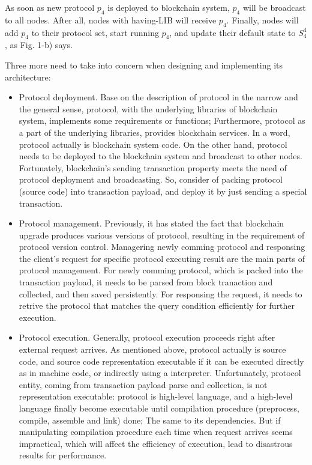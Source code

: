 \documentclass[sigplan,screen]{acmart}
\begin{document}
As soon as new protocol $p_4$ is deployed to blockchain system,
$p_4$ will be broadcast to all nodes. After all, nodes with having-LIB
will receive $p_4$. Finally, nodes will add $p_4$ to their protocol set, start
running $p_4$, and update their default state to $S_4^4$, as Fig. 1-b) says.

Three more need to take into concern when designing and implementing its
architecture:
\begin{itemize}
  \item Protocol deployment. Base on the description of protocol in the narrow
    and the general sense, protocol, with the underlying libraries of
    blockchain system, implements some requirements or functions; Furthermore,
    protocol as a part of the underlying libraries, provides blockchain services.
    In a word, protocol actually is blockchain system code. On the other hand,
    protocol needs to be deployed to the blockchain system and broadcast to
    other nodes. Fortunately, blockchain's sending transaction property meets
    the need of protocol deployment and broadcasting. So, consider of packing
    protocol (source code) into transaction payload, and deploy it by just
    sending a special transaction.
  \item Protocol management. Previously, it has stated the fact that blockchain
    upgrade produces various versions of protocol, resulting in the
    requirement of protocol version control. Managering newly comming protocol
    and responsing the client's request for specific protocol executing result
    are the main parts of protocol management. For newly comming protocol,
    which is packed into the transaction payload, it needs to be parsed from
    block tranaction and collected, and then saved persistently. For responsing
    the request, it needs to retrive the protocol that matches the query
    condition efficiently for further execution.
  \item Protocol execution. Generally, protocol execution proceeds right after external
    request arrives. As mentioned above, protocol actually is source code, and
    source code representation executable if it can be executed directly as in
    machine code, or indirectly using a interpreter. Unfortunately, protocol
    entity, coming from transaction payload parse and collection, is not
    representation executable: protocol is high-level language, and a
    high-level language finally become executable until compilation procedure
    (preprocess, compile, assemble and link) done; The same to its
    dependencies. But if manipulating compilation procedure each time when
    request arrives seems impractical, which will affect the efficiency of
    execution, lead to disastrous results for performance.


\end{itemize}
\end{document}
